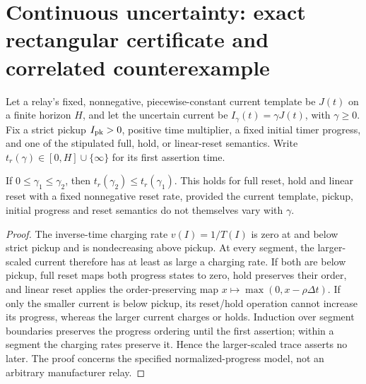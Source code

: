 \section{Continuous uncertainty: exact rectangular certificate and correlated counterexample}
\label{sec:p13-continuum}
Let a relay's fixed, nonnegative, piecewise-constant current template be \(J(t)\) on a finite horizon \(H\), and let the uncertain current be \(I_\gamma(t)=\gamma J(t)\), with \(\gamma\ge0\). Fix a strict pickup \(I_{\rm pk}>0\), positive time multiplier, a fixed initial timer progress, and one of the stipulated full, hold, or linear-reset semantics. Write \(t_r(\gamma)\in[0,H]\cup\{\infty\}\) for its first assertion time.

\begin{proposition}
\label{prop:p13-monotone}
If \(0\le\gamma_1\le\gamma_2\), then \(t_r(\gamma_2)\le t_r(\gamma_1)\). This holds for full reset, hold and linear reset with a fixed nonnegative reset rate, provided the current template, pickup, initial progress and reset semantics do not themselves vary with \(\gamma\).
\end{proposition}
\begin{proof}
The inverse-time charging rate \(v(I)=1/T(I)\) is zero at and below strict pickup and is nondecreasing above pickup. At every segment, the larger-scaled current therefore has at least as large a charging rate. If both are below pickup, full reset maps both progress states to zero, hold preserves their order, and linear reset applies the order-preserving map \(x\mapsto\max(0,x-\rho\Delta t)\). If only the smaller current is below pickup, its reset/hold operation cannot increase its progress, whereas the larger current charges or holds. Induction over segment boundaries preserves the progress ordering until the first assertion; within a segment the charging rates preserve it. Hence the larger-scaled trace asserts no later. The proof concerns the specified normalized-progress model, not an arbitrary manufacturer relay.
\end{proof}

